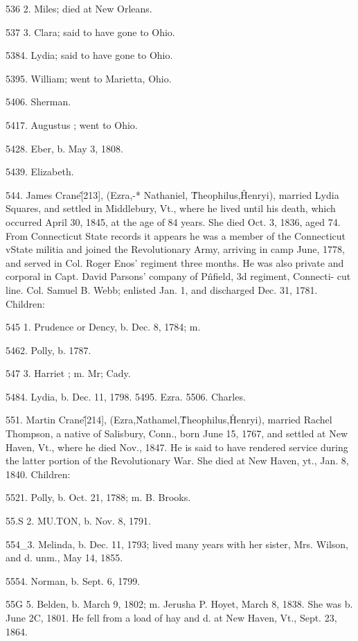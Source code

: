 536  2. Miles; died at New Orleans. 

537  3. Clara; said to have gone to Ohio. 

5384. Lydia; said to have gone to Ohio. 

5395. William; went to Marietta, Ohio. 

5406. Sherman. 

5417. Augustus ; went to Ohio. 

5428. Eber, b. May 3, 1808. 

5439. Elizabeth. 

544. James Crane\^ [213], (Ezra,-* Nathaniel, \^ Theophilus,\^ 
Henryi), married Lydia Squares, and settled in Middlebury, Vt., 
where he lived until his death, which occurred April 30, 1845, at 
the age of 84 years. She died Oct. 3, 1836, aged 74. From 
Connecticut State records it appears he was a member of the 
Connecticut vState militia and joined the Revolutionary Army, 
arriving in camp June, 1778, and served in Col. Roger Enos' 
regiment three months. He was also private and corporal in 
Capt. David Parsons' company of P\^nfield, 3d regiment, Connecti- 
cut line. Col. Samuel B. Webb; enlisted Jan. 1, and discharged 
Dec. 31, 1781. Children: 

545  1. Prudence or Dency, b. Dec. 8, 1784; m. 

5462. Polly, b. 1787. 

547  3. Harriet ; m. Mr; Cady. 




5484. Lydia, b. Dec. 11, 1798. 
5495. Ezra. 
5506. Charles. 

551. Martin Crane\^ [214], (Ezra,\^ Nathamel,\^ Theophilus,\^ 
Henryi), married Rachel Thompson, a native of Salisbury, Conn., 
born June 15, 1767, and settled at New Haven, Vt., where he 
died Nov., 1847. He is said to have rendered service during the 
latter portion of the Revolutionary War. She died at New 
Haven, yt., Jan. 8, 1840. Children: 

5521. Polly, b. Oct. 21, 1788; m. B. Brooks. 

55.S  2. MU.TON, b. Nov. 8, 1791. 

554\_3. Melinda, b. Dec. 11, 1793; lived many years with her sister, 
Mrs. Wilson, and d. unm., May 14, 1855. 

5554. Norman, b. Sept. 6, 1799. 

55G 5. Belden, b. March 9, 1802; m. Jerusha P. Hoyet, March 8, 
1838. She was b. June 2C, 1801. He fell from a load of 
hay and d. at New Haven, Vt., Sept. 23, 1864. 

